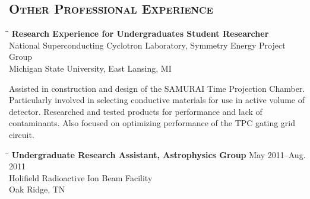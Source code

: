 \documentclass[10pt]{res} %
\begin{document}
\begin{resume}

\section{\textsc{Other Professional Experience}}
\vspace{-0.1in}
\begin{tabbing}
\hspace{2.3in}\= \hspace{2.5in}\= \kill %
  \textbf{Research Experience for Undergraduates Student Researcher} \> \\
National Superconducting Cyclotron Laboratory, Symmetry Energy Project Group \\
Michigan State University, East Lansing, MI \\
\end{tabbing}\vspace{-20pt}      %

Assisted in construction and design of the SAMURAI Time Projection Chamber. 
Particularly involved in selecting conductive materials for use in active 
volume of detector. Researched and tested products for performance and lack 
of contaminants. Also focused on optimizing performance of the TPC gating grid circuit.

\begin{tabbing}
\hspace{2.3in}\= \hspace{2.5in}\= \kill %
\textbf{Undergraduate Research Assistant, Astrophysics Group} \>\> May 2011--Aug. 2011\\
Holifield Radioactive Ion Beam Facility \\
Oak Ridge, TN \\
\end{tabbing}\vspace{-20pt}      %


\end{resume}
\end{document}
